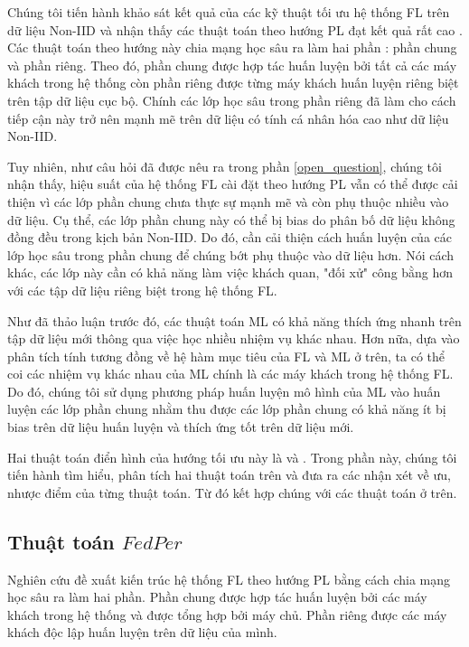 Chúng tôi tiến hành khảo sát kết quả của các kỹ thuật tối ưu hệ thống FL trên dữ liệu Non-IID và nhận thấy các thuật toán theo hướng PL đạt kết quả rất cao . Các thuật toán theo hướng này chia mạng học sâu ra làm hai phần \cite{zhu2021federated}: phần chung và phần riêng. Theo đó, phần chung được hợp tác huấn luyện bởi tất cả các máy khách trong hệ thống còn phần riêng được từng máy khách huấn luyện riêng biệt trên tập dữ liệu cục bộ. Chính các lớp học sâu trong phần riêng đã làm cho cách tiếp cận này trở nên mạnh mẽ trên dữ liệu có tính cá nhân hóa cao như dữ liệu Non-IID.

Tuy nhiên, như câu hỏi đã được nêu ra trong phần \ref{open_question}, chúng tôi nhận thấy, hiệu suất của hệ thống FL cài đặt theo hướng PL vẫn có thể được cải thiện vì các lớp phần chung chưa thực sự mạnh mẽ và còn phụ thuộc nhiều vào dữ liệu. Cụ thể, các lớp phần chung này có thể bị bias do phân bố dữ liệu không đồng đều trong kịch bản Non-IID. Do đó, cần cải thiện cách huấn luyện của các lớp học sâu trong phần chung để chúng bớt phụ thuộc vào dữ liệu hơn. Nói cách khác, các lớp này cần có khả năng làm việc khách quan, "đối xử" công bằng hơn với các tập dữ liệu riêng biệt trong hệ thống FL.

Như đã thảo luận trước đó, các thuật toán ML có khả năng thích ứng nhanh trên tập dữ liệu mới thông qua việc học nhiều nhiệm vụ khác nhau. Hơn nữa, dựa vào phân tích tính tương đồng về hệ hàm mục tiêu của FL và ML ở trên, ta có thể coi các nhiệm vụ khác nhau của ML chính là các máy khách trong hệ thống FL. Do đó, chúng tôi sử dụng phương pháp huấn luyện mô hình của ML vào huấn luyện các lớp phần chung nhằm thu được các lớp phần chung có khả năng ít bị bias trên dữ liệu huấn luyện và thích ứng tốt trên dữ liệu mới.

Hai thuật toán điển hình của hướng tối ưu này là  \cite{arivazhagan2019federated} và  \cite{liang2020think}. Trong phần này, chúng tôi tiến hành tìm hiểu, phân tích hai thuật toán trên và đưa ra các nhận xét về ưu, nhược điểm của từng thuật toán. Từ đó kết hợp chúng với các thuật toán  ở trên.

\subsection{Thuật toán $FedPer$}


Nghiên cứu \cite{arivazhagan2019federated} đề xuất kiến trúc hệ thống FL theo hướng PL bằng cách chia mạng học sâu ra làm hai phần. Phần chung được hợp tác huấn luyện bởi các máy khách trong hệ thống và được tổng hợp bởi máy chủ. Phần riêng được các máy khách độc lập huấn luyện trên dữ liệu của mình.

